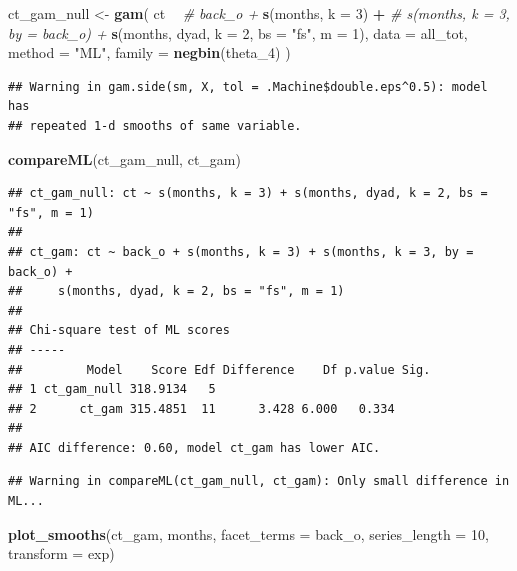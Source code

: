 \documentclass[]{article}
\newenvironment{Shaded}{\begin{snugshade}}{\end{snugshade}}
\newcommand{\CommentTok}[1]{\textcolor[rgb]{0.56,0.35,0.01}{\textit{#1}}}
\newcommand{\DataTypeTok}[1]{\textcolor[rgb]{0.13,0.29,0.53}{#1}}
\newcommand{\DecValTok}[1]{\textcolor[rgb]{0.00,0.00,0.81}{#1}}
\newcommand{\KeywordTok}[1]{\textcolor[rgb]{0.13,0.29,0.53}{\textbf{#1}}}
\newcommand{\NormalTok}[1]{#1}
\newcommand{\OperatorTok}[1]{\textcolor[rgb]{0.81,0.36,0.00}{\textbf{#1}}}
\newcommand{\StringTok}[1]{\textcolor[rgb]{0.31,0.60,0.02}{#1}}
\begin{document}
\begin{Shaded}
\begin{Highlighting}[]
\NormalTok{ct_gam_null <-}\StringTok{ }\KeywordTok{gam}\NormalTok{(}
\NormalTok{  ct }\OperatorTok{~}
\StringTok{    }\CommentTok{# back_o +}
\StringTok{    }\KeywordTok{s}\NormalTok{(months, }\DataTypeTok{k =} \DecValTok{3}\NormalTok{) }\OperatorTok{+}
\StringTok{    }\CommentTok{# s(months, k = 3, by = back_o) +}
\StringTok{    }\KeywordTok{s}\NormalTok{(months, dyad, }\DataTypeTok{k =} \DecValTok{2}\NormalTok{, }\DataTypeTok{bs =} \StringTok{"fs"}\NormalTok{, }\DataTypeTok{m =} \DecValTok{1}\NormalTok{),}
  \DataTypeTok{data =}\NormalTok{ all_tot,}
  \DataTypeTok{method =} \StringTok{"ML"}\NormalTok{,}
  \DataTypeTok{family =} \KeywordTok{negbin}\NormalTok{(theta_}\DecValTok{4}\NormalTok{)}
\NormalTok{)}
\end{Highlighting}
\end{Shaded}

\begin{verbatim}
## Warning in gam.side(sm, X, tol = .Machine$double.eps^0.5): model has
## repeated 1-d smooths of same variable.
\end{verbatim}

\begin{Shaded}
\begin{Highlighting}[]
\KeywordTok{compareML}\NormalTok{(ct_gam_null, ct_gam)}
\end{Highlighting}
\end{Shaded}

\begin{verbatim}
## ct_gam_null: ct ~ s(months, k = 3) + s(months, dyad, k = 2, bs = "fs", m = 1)
## 
## ct_gam: ct ~ back_o + s(months, k = 3) + s(months, k = 3, by = back_o) + 
##     s(months, dyad, k = 2, bs = "fs", m = 1)
## 
## Chi-square test of ML scores
## -----
##         Model    Score Edf Difference    Df p.value Sig.
## 1 ct_gam_null 318.9134   5                              
## 2      ct_gam 315.4851  11      3.428 6.000   0.334     
## 
## AIC difference: 0.60, model ct_gam has lower AIC.
\end{verbatim}

\begin{verbatim}
## Warning in compareML(ct_gam_null, ct_gam): Only small difference in ML...
\end{verbatim}

\begin{Shaded}
\begin{Highlighting}[]
\KeywordTok{plot_smooths}\NormalTok{(ct_gam, months, }\DataTypeTok{facet_terms =}\NormalTok{ back_o, }\DataTypeTok{series_length =} \DecValTok{10}\NormalTok{, }\DataTypeTok{transform =}\NormalTok{ exp)}
\end{Highlighting}
\end{Shaded}
\end{document}
